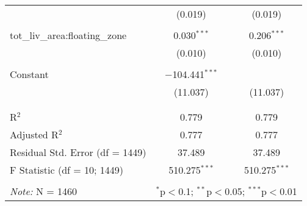 \documentclass[a4paper]{article}
\begin{document}
\begin{table}[!htbp]
\begin{tabular}{@{\extracolsep{0pt}}lcc}
  & (0.019) & (0.019) \\ 
  & & \\ 
 tot\_liv\_area:floating\_zone & 0.030$^{***}$ & 0.206$^{***}$ \\ 
  & (0.010) & (0.010) \\ 
  & & \\ 
 Constant & $-$104.441$^{***}$ &  \\ 
  & (11.037) & (11.037) \\ 
  & & \\ 
\hline \\[-1.8ex] 
R$^{2}$ & 0.779 & 0.779 \\ 
Adjusted R$^{2}$ & 0.777 & 0.777 \\ 
Residual Std. Error (df = 1449) & 37.489 & 37.489 \\ 
F Statistic (df = 10; 1449) & 510.275$^{***}$ & 510.275$^{***}$ \\ 
\hline 
\hline \\[-1.8ex] 
\textit{Note:} N = 1460 & \multicolumn{2}{r}{$^{*}$p$<$0.1; $^{**}$p$<$0.05; $^{***}$p$<$0.01} \\ 
\end{tabular} 
\end{table}
\end{document}
